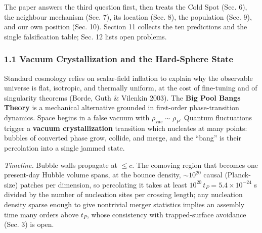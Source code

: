 \documentclass[
]{article}
\begin{document}
The paper answers the third question first, then treats the Cold Spot
(Sec. 6), the neighbour mechanism (Sec. 7), its location (Sec. 8), the
population (Sec. 9), and our own position (Sec. 10). Section 11 collects
the ten predictions and the single falsification table; Sec. 12 lists
open problems.

\hypertarget{vacuum-crystallization-and-the-hard-sphere-state}{%
\subsubsection{\texorpdfstring{\textbf{1.1 Vacuum Crystallization and
the Hard-Sphere
State}}{1.1 Vacuum Crystallization and the Hard-Sphere State}}\label{vacuum-crystallization-and-the-hard-sphere-state}}

Standard cosmology relies on scalar-field inflation to explain why the
observable universe is flat, isotropic, and thermally uniform, at the
cost of fine-tuning and of singularity theorems (Borde, Guth \& Vilenkin
2003). The \textbf{Big Pool Bangs Theory} is a mechanical alternative
grounded in first-order phase-transition dynamics. Space begins in a
false vacuum with \(\rho_{\text{vac}} \sim \rho_P\). Quantum
fluctuations trigger a \textbf{vacuum crystallization} transition which
nucleates at many points: bubbles of converted phase grow, collide, and
merge, and the ``bang'' is their percolation into a single jammed state.

\emph{Timeline.} Bubble walls propagate at \(\leq c\). The comoving
region that becomes one present-day Hubble volume spans, at the bounce
density, \(\sim\!10^{20}\) causal (Planck-size) patches per dimension,
so percolating it takes at least \(10^{20}\,t_P = 5.4\times10^{-24}\) s
divided by the number of nucleation sites per crossing length; any
nucleation density sparse enough to give nontrivial merger statistics
implies an assembly time many orders above \(t_P\), whose consistency
with trapped-surface avoidance (Sec. 3) is open.
\end{document}
